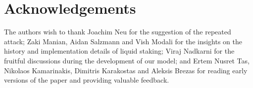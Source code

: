 \section{Acknowledgements}

The authors wish to thank Joachim Neu for the suggestion of the repeated attack;
Zaki Manian, Aidan Salzmann and Vish Modali for the insights on the history and
implementation details of liquid staking;
Viraj Nadkarni for the fruitful discussions during the
development of our model; and Ertem Nusret Tas, Nikolaos Kamarinakis,
Dimitris Karakostas and Aleksis Brezas for reading early versions of the paper
and providing valuable feedback.
